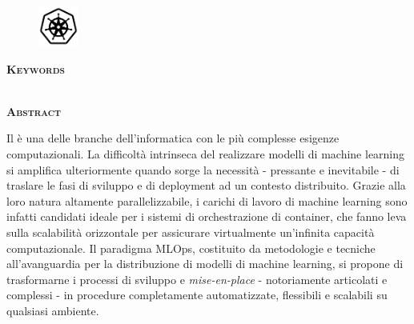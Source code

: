 % 
% 
% 

\newpage

\clearpage
\cleardoublepage
{}

\pagestyle{plain}


\begin{figure}
    \centering
    \includegraphics[width=50px]{figures/logos/k8s-bw-2.png}
    \label{fig:abstract:kubernetes}
\end{figure}

\begin{center}
    \large \textbf{\thesisTitle}
\end{center}

{\noindent \textbf{\textsc{Keywords}}}

{\noindent \thesisKeywords}\\


{\noindent \textbf{\textsc{Abstract}}}

\noindent Il  è una delle branche dell'informatica con le più complesse esigenze computazionali. La difficoltà intrinseca del realizzare modelli di machine learning si amplifica ulteriormente quando sorge la necessità - pressante e inevitabile - di traslare le fasi di sviluppo e di deployment ad un contesto distribuito. Grazie alla loro natura altamente parallelizzabile, i carichi di lavoro di machine learning sono infatti candidati ideale per i sistemi di orchestrazione di container, che fanno leva sulla scalabilità orizzontale per assicurare virtualmente un'infinita capacità computazionale. Il paradigma MLOps, costituito da metodologie e tecniche all'avanguardia per la distribuzione di modelli di machine learning, si propone di trasformarne i processi di sviluppo e \textit{mise-en-place} - notoriamente articolati e complessi - in procedure completamente automatizzate, flessibili e scalabili su qualsiasi ambiente.

